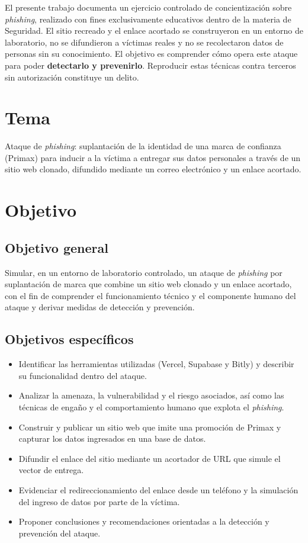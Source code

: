 \documentclass[12pt,a4paper]{article}
\begin{document}
El presente trabajo documenta un ejercicio controlado de concientización sobre \textit{phishing}, realizado con fines exclusivamente educativos dentro de la materia de Seguridad. El sitio recreado y el enlace acortado se construyeron en un entorno de laboratorio, no se difundieron a víctimas reales y no se recolectaron datos de personas sin su conocimiento. El objetivo es comprender cómo opera este ataque para poder \textbf{detectarlo y prevenirlo}. Reproducir estas técnicas contra terceros sin autorización constituye un delito.

\section{Tema}

Ataque de \textit{phishing}: suplantación de la identidad de una marca de confianza (Primax) para inducir a la víctima a entregar sus datos personales a través de un sitio web clonado, difundido mediante un correo electrónico y un enlace acortado.

\section{Objetivo}

\subsection{Objetivo general}

Simular, en un entorno de laboratorio controlado, un ataque de \textit{phishing} por suplantación de marca que combine un sitio web clonado y un enlace acortado, con el fin de comprender el funcionamiento técnico y el componente humano del ataque y derivar medidas de detección y prevención.

\subsection{Objetivos específicos}

\begin{itemize}[leftmargin=1.5cm]
  \item Identificar las herramientas utilizadas (Vercel, Supabase y Bitly) y describir su funcionalidad dentro del ataque.
  \item Analizar la amenaza, la vulnerabilidad y el riesgo asociados, así como las técnicas de engaño y el comportamiento humano que explota el \textit{phishing}.
  \item Construir y publicar un sitio web que imite una promoción de Primax y capturar los datos ingresados en una base de datos.
  \item Difundir el enlace del sitio mediante un acortador de URL que simule el vector de entrega.
  \item Evidenciar el redireccionamiento del enlace desde un teléfono y la simulación del ingreso de datos por parte de la víctima.
  \item Proponer conclusiones y recomendaciones orientadas a la detección y prevención del ataque.
\end{itemize}
\end{document}
